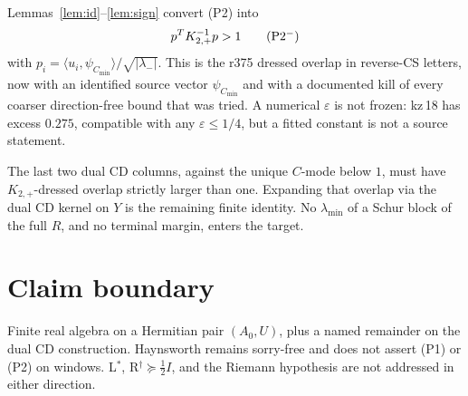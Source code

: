 \documentclass[11pt]{article}
\theoremstyle{remark}
\newcommand{\half}{\tfrac12}
\newcommand{\lam}{\lambda_{-}}
\newcommand{\Kp}{K_{2,+}}
\begin{document}
Lemmas~\ref{lem:id}--\ref{lem:sign} convert (P2) into
\begin{equation}\label{eq:red}
p^{T}\Kp^{-1}p>1
\tag{P2$^{-}$}
\end{equation}
with $p_{i}=\langle u_{i},\psi_{C_{\min}}\rangle/\sqrt{|\lam|}$.
This is the r375 dressed overlap in reverse-CS letters, now
with an identified source vector $\psi_{C_{\min}}$ and with a
documented kill of every coarser direction-free bound that
was tried.  A numerical $\varepsilon$ is not frozen: kz\,18 has
excess $0.275$, compatible with any $\varepsilon\le 1/4$, but
a fitted constant is not a source statement.

The last two dual CD columns, against the unique $C$-mode below
$1$, must have $\Kp$-dressed overlap strictly larger than one.
Expanding that overlap via the dual CD kernel on $Y$ is the
remaining finite identity.  No $\lambda_{\min}$ of a Schur block
of the full $R$, and no terminal margin, enters the target.

\section{Claim boundary}

Finite real algebra on a Hermitian pair $(A_{0},U)$, plus a
named remainder on the dual CD construction.  Haynsworth remains
sorry-free and does not assert (P1) or (P2) on windows.
L$^{*}$, R$^{\dagger}\succeq\half I$, and the Riemann hypothesis
are not addressed in either direction.
\end{document}
